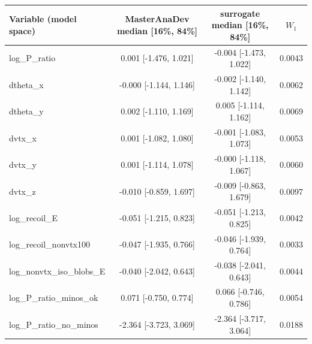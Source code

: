 \begin{tabular}{lccc}
\toprule
Variable (model space) & MasterAnaDev median [16\%, 84\%] & surrogate median [16\%, 84\%] & $W_1$ \\
\midrule
log\_P\_ratio & 0.001 [-1.476, 1.021] & -0.004 [-1.473, 1.022] & 0.0043 \\
dtheta\_x & -0.000 [-1.144, 1.146] & -0.002 [-1.140, 1.142] & 0.0062 \\
dtheta\_y & 0.002 [-1.110, 1.169] & 0.005 [-1.114, 1.162] & 0.0069 \\
dvtx\_x & 0.001 [-1.082, 1.080] & -0.001 [-1.083, 1.073] & 0.0053 \\
dvtx\_y & 0.001 [-1.114, 1.078] & -0.000 [-1.118, 1.067] & 0.0060 \\
dvtx\_z & -0.010 [-0.859, 1.697] & -0.009 [-0.863, 1.679] & 0.0097 \\
log\_recoil\_E & -0.051 [-1.215, 0.823] & -0.051 [-1.213, 0.825] & 0.0042 \\
log\_recoil\_nonvtx100 & -0.047 [-1.935, 0.766] & -0.046 [-1.939, 0.764] & 0.0033 \\
log\_nonvtx\_iso\_blobs\_E & -0.040 [-2.042, 0.643] & -0.038 [-2.041, 0.643] & 0.0044 \\
log\_P\_ratio\_minos\_ok & 0.071 [-0.750, 0.774] & 0.066 [-0.746, 0.786] & 0.0054 \\
log\_P\_ratio\_no\_minos & -2.364 [-3.723, 3.069] & -2.364 [-3.717, 3.064] & 0.0188 \\
\bottomrule
\end{tabular}
